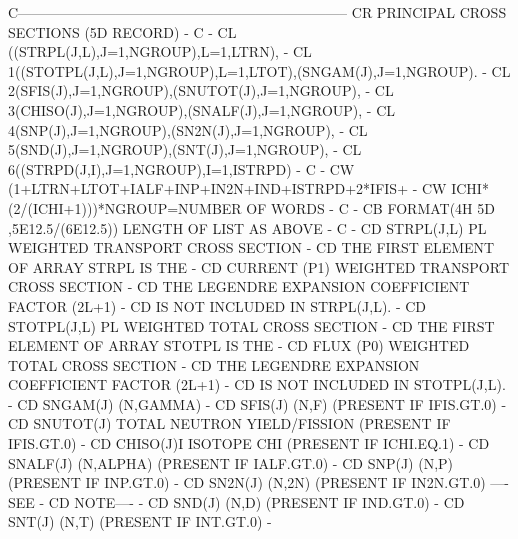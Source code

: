 \begin{ccode}
C-----------------------------------------------------------------------
CR          PRINCIPAL CROSS SECTIONS   (5D RECORD)                     -
C                                                                      -
CL    ((STRPL(J,L),J=1,NGROUP),L=1,LTRN),                              -
CL   1((STOTPL(J,L),J=1,NGROUP),L=1,LTOT),(SNGAM(J),J=1,NGROUP).       -
CL   2(SFIS(J),J=1,NGROUP),(SNUTOT(J),J=1,NGROUP),                     -
CL   3(CHISO(J),J=1,NGROUP),(SNALF(J),J=1,NGROUP),                     -
CL   4(SNP(J),J=1,NGROUP),(SN2N(J),J=1,NGROUP),                        -
CL   5(SND(J),J=1,NGROUP),(SNT(J),J=1,NGROUP),                         -
CL   6((STRPD(J,I),J=1,NGROUP),I=1,ISTRPD)                             -
C                                                                      -
CW   (1+LTRN+LTOT+IALF+INP+IN2N+IND+ISTRPD+2*IFIS+                     -
CW   ICHI*(2/(ICHI+1)))*NGROUP=NUMBER OF WORDS                         -
C                                                                      -
CB   FORMAT(4H 5D ,5E12.5/(6E12.5)) LENGTH OF LIST AS ABOVE            -
C                                                                      -
CD    STRPL(J,L)   PL WEIGHTED TRANSPORT CROSS SECTION                 -
CD                    THE FIRST ELEMENT OF ARRAY STRPL IS THE          -
CD                    CURRENT (P1) WEIGHTED TRANSPORT CROSS SECTION    -
CD                    THE LEGENDRE EXPANSION COEFFICIENT FACTOR (2L+1) -
CD                    IS NOT INCLUDED IN STRPL(J,L).                   -
CD    STOTPL(J,L)  PL WEIGHTED TOTAL CROSS SECTION                     -
CD                    THE FIRST ELEMENT OF ARRAY STOTPL IS THE         -
CD                    FLUX (P0) WEIGHTED TOTAL CROSS SECTION           -
CD                    THE LEGENDRE EXPANSION COEFFICIENT FACTOR (2L+1) -
CD                    IS NOT INCLUDED IN STOTPL(J,L).                  -
CD    SNGAM(J)     (N,GAMMA)                                           -
CD    SFIS(J)      (N,F)        (PRESENT IF IFIS.GT.0)                 -
CD    SNUTOT(J)    TOTAL NEUTRON YIELD/FISSION (PRESENT IF IFIS.GT.0)  -
CD    CHISO(J)I    ISOTOPE CHI  (PRESENT IF ICHI.EQ.1)                 -
CD    SNALF(J)     (N,ALPHA)    (PRESENT IF IALF.GT.0)                 -
CD    SNP(J)       (N,P)        (PRESENT IF INP.GT.0)                  -
CD    SN2N(J)      (N,2N)       (PRESENT IF IN2N.GT.0)  ----SEE        -
CD                    NOTE----                                         -
CD    SND(J)       (N,D)        (PRESENT IF IND.GT.0)                  -
CD    SNT(J)       (N,T)        (PRESENT IF INT.GT.0)                  -

\end{ccode}
